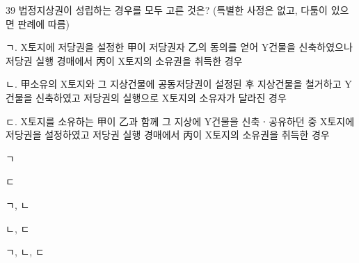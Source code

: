 \begin{question}{39}
법정지상권이 성립하는 경우를 모두 고른 것은? (특별한 사정은 없고, 다툼이 있으면 판례에 따름)
\begin{framedtext}
ㄱ. X토지에 저당권을 설정한 甲이 저당권자 乙의 동의를 얻어 Y건물을 신축하였으나 저당권 실행 경매에서 丙이 X토지의 소유권을 취득한 경우 \par
ㄴ. 甲소유의 X토지와 그 지상건물에 공동저당권이 설정된 후 지상건물을 철거하고 Y건물을 신축하였고 저당권의 실행으로 X토지의 소유자가 달라진 경우 \par
ㄷ. X토지를 소유하는 甲이 乙과 함께 그 지상에 Y건물을 신축ㆍ공유하던 중 X토지에 저당권을 설정하였고 저당권 실행 경매에서 丙이 X토지의 소유권을 취득한 경우 \par
\end{framedtext}
\begin{choices}
  \item ㄱ
  \item ㄷ
  \item ㄱ, ㄴ
  \item ㄴ, ㄷ
  \item ㄱ, ㄴ, ㄷ
\end{choices}
\end{question}
